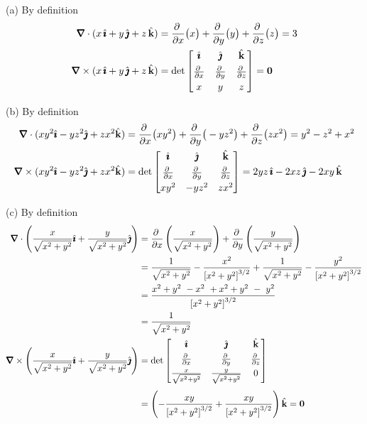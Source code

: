 \begin{solution} 
(a)
By definition
\begin{align*}
\vnabla\cdot(x\,\hi+y\,\hj+z\,\hk)
&=\pdiff{}{x}\big(x\big)
  +\pdiff{}{y}\big(y\big)
  +\pdiff{}{z}\big(z\big)
=  3 \\
\vnabla\times(x\,\hi+y\,\hj+z\,\hk)
&=\det\left[\begin{matrix}\hi & \hj & \hk \\[0.05in]
                  \pdiff{}{x} &
                  \pdiff{}{y} &
                  \pdiff{}{z} \\[0.05in]
                  x & y & z\end{matrix}\right]
= \vZero
\end{align*}

(b)
By definition
\begin{align*}
\vnabla\cdot(xy^2\hi-yz^2\hj+zx^2\hk)
&=\pdiff{}{x}\big(xy^2\big)
  +\pdiff{}{y}\big(-yz^2\big)
  +\pdiff{}{z}\big(zx^2\big)
=y^2-z^2+x^2 \\
\vnabla\times(xy^2\hi-yz^2\hj+zx^2\hk)
&=\det\left[\begin{matrix}\hi & \hj & \hk \\[0.05in]
                  \pdiff{}{x} &
                  \pdiff{}{y} &
                  \pdiff{}{z} \\[0.05in]
                  xy^2 & -yz^2 & zx^2\end{matrix}\right]
= 2yz\,\hi-2xz\,\hj-2xy\,\hk
\end{align*}

(c)
By definition
\begin{align*}
\vnabla\cdot\left(\frac{x}{\sqrt{x^2+y^2}}\hi+\frac{y}{\sqrt{x^2+y^2}}\hj\right)
&=\pdiff{}{x}\left(\frac{x}{\sqrt{x^2+y^2}}\right)
  +\pdiff{}{y}\left(\frac{y}{\sqrt{x^2+y^2}}\right) \\
&= \frac{1}{\sqrt{x^2+y^2}} - \frac{x^2}{{[x^2+y^2]}^{3/2}}
   +\frac{1}{\sqrt{x^2+y^2}} - \frac{y^2}{{[x^2+y^2]}^{3/2}} \\
&=\frac{x^2+y^2\ -x^2\ +x^2+y^2\ -\ y^2}{{[x^2+y^2]}^{3/2}} \\
&=\frac{1}{\sqrt{x^2+y^2}} \\
\vnabla\times\left(\frac{x}{\sqrt{x^2+y^2}}\hi+\frac{y}{\sqrt{x^2+y^2}}\hj\right)
&=\det\left[\begin{matrix}\hi & \hj & \hk \\[0.05in]
                  \pdiff{}{x} &
                  \pdiff{}{y} &
                  \pdiff{}{z} \\[0.05in]
                  \frac{x}{\sqrt{x^2+y^2}} & 
                  \frac{y}{\sqrt{x^2+y^2}} & 0\end{matrix}\right] \\[0.05in]
&=\left(- \frac{xy}{{[x^2+y^2]}^{3/2}}+ \frac{xy}{{[x^2+y^2]}^{3/2}}\right)\hk
= \vZero
\end{align*}


\end{solution}
